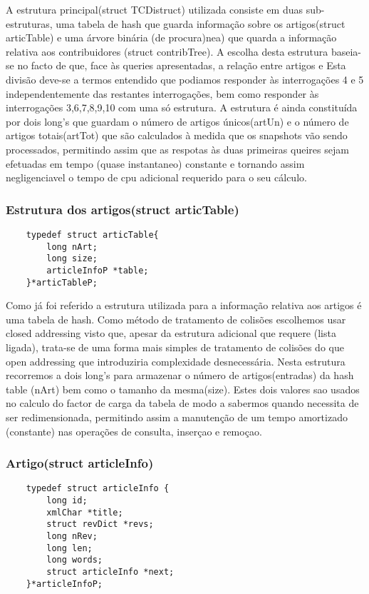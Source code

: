 \documentclass{report}
\begin{document}
A estrutura principal(struct TCDistruct) utilizada consiste em duas sub-estruturas, uma tabela de hash que guarda informação sobre os artigos(struct articTable) e uma árvore binária (de procura)nea) que quarda a informação relativa aos contribuidores (struct contribTree). A escolha desta estrutura baseia-se no facto de que, face às queries apresentadas, a relação entre artigos e  Esta divisão deve-se a termos entendido que podiamos responder às interrogações 4 e 5 independentemente das restantes interrogações, bem como responder às interrogações 3,6,7,8,9,10 com uma só estrutura. A estrutura é ainda constituída por dois long's que guardam o número de artigos únicos(artUn) e o número de artigos totais(artTot) que são calculados à medida que os snapshots vão sendo processados, permitindo assim que as respotas às duas primeiras queires sejam efetuadas em tempo (quase instantaneo) constante e tornando assim negligenciavel o tempo de cpu adicional requerido para o seu cálculo.

\subsubsection{Estrutura dos artigos(struct articTable)}
\begin{verbatim}
    typedef struct articTable{
        long nArt;
        long size;
        articleInfoP *table;
    }*articTableP;
\end{verbatim}


Como já foi referido a estrutura utilizada para a informação relativa aos artigos é uma tabela de hash. Como método de tratamento de colisões escolhemos usar closed addressing visto que, apesar da estrutura adicional que requere (lista ligada), trata-se de uma forma mais simples de tratamento de colisões do que open addressing que introduziria complexidade desnecessária.
Nesta estrutura recorremos a dois long's para armazenar o número de artigos(entradas) da hash table (nArt) bem como o tamanho da mesma(size). Estes dois valores sao usados no calculo do factor de carga da tabela de modo a sabermos quando necessita de ser redimensionada, permitindo assim a manutenção de um tempo amortizado (constante) nas operações de consulta, inserçao e remoçao. 

\subsubsection{Artigo(struct articleInfo)}
\begin{verbatim}
    typedef struct articleInfo {
        long id; 
        xmlChar *title;
        struct revDict *revs;
        long nRev;
        long len;
        long words;
        struct articleInfo *next;
    }*articleInfoP;    
\end{verbatim}
\end{document}
